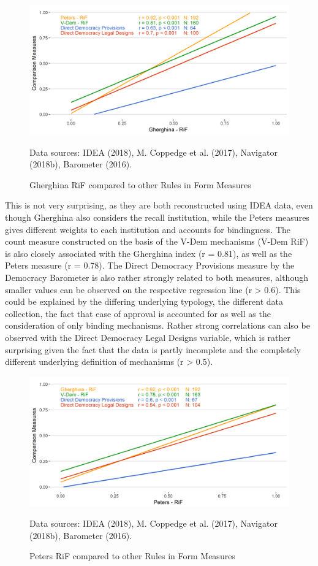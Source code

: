 \documentclass[]{article}
\begin{document}
\begin{figure}[!th]
    \caption{Gherghina RiF compared to other Rules in Form Measures}
    \label{gherg_rif}
    \includegraphics[width=\textwidth]{images/rif_ghergina.png}
    \flushright
    {\scriptsize Data sources: IDEA (2018), M. Coppedge et al. (2017), Navigator (2018b), Barometer (2016).\par}
\end{figure}

This is not very surprising, as they are both reconstructed using IDEA
data, even though Gherghina also considers the recall institution, while
the Peters measures gives different weights to each institution and
accounts for bindingness. The count measure constructed on the basis of
the V-Dem mechanisms (V-Dem RiF) is also closely associated with the
Gherghina index (r = 0.81), as well as the Peters measure (r = 0.78).
The Direct Democracy Provisions measure by the Democracy Barometer is
also rather strongly related to both measures, although smaller values
can be observed on the respective regression line (r \textgreater{}
0.6). This could be explained by the differing underlying typology, the
different data collection, the fact that ease of approval is accounted
for as well as the consideration of only binding mechanisms. Rather
strong correlations can also be observed with the Direct Democracy Legal
Designs variable, which is rather surprising given the fact that the
data is partly incomplete and the completely different underlying
definition of mechanisms (r \textgreater{} 0.5).

\begin{figure}[!th]
    \caption{Peters RiF compared to other Rules in Form Measures}
    \label{peters_rif}
    \includegraphics[width=\textwidth]{images/rif_peters.png}
    \flushright
    {\scriptsize Data sources: IDEA (2018), M. Coppedge et al. (2017), Navigator (2018b), Barometer (2016).\par}
\end{figure}
\end{document}
